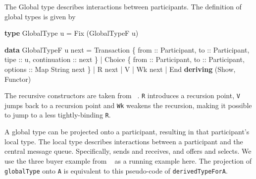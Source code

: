\documentclass[runningheads]{llncs}
\newenvironment{Shaded}{}{}
\newcommand{\KeywordTok}[1]{\textcolor[rgb]{0.00,0.44,0.13}{\textbf{#1}}}
\newcommand{\DataTypeTok}[1]{\textcolor[rgb]{0.56,0.13,0.00}{#1}}
\newcommand{\OtherTok}[1]{\textcolor[rgb]{0.00,0.44,0.13}{#1}}
\newcommand{\FunctionTok}[1]{\textcolor[rgb]{0.02,0.16,0.49}{#1}}
\newcommand{\NormalTok}[1]{#1}
\begin{document}
The Global type describes interactions between participants. The
definition of global types is given by

\begin{Shaded}
\begin{Highlighting}[]
\KeywordTok{type} \DataTypeTok{GlobalType}\NormalTok{ u }\FunctionTok{=} \DataTypeTok{Fix}\NormalTok{ (}\DataTypeTok{GlobalTypeF}\NormalTok{ u)}

\KeywordTok{data} \DataTypeTok{GlobalTypeF}\NormalTok{ u next}
    \FunctionTok{=} \DataTypeTok{Transaction} 
\NormalTok{        \{}\OtherTok{ from ::} \DataTypeTok{Participant}\NormalTok{,}\OtherTok{ to ::} \DataTypeTok{Participant}\NormalTok{,}\OtherTok{ tipe ::}\NormalTok{ u,}\OtherTok{ continuation ::}\NormalTok{  next \} }
    \FunctionTok{|} \DataTypeTok{Choice} 
\NormalTok{        \{}\OtherTok{ from ::} \DataTypeTok{Participant}\NormalTok{,}\OtherTok{ to ::} \DataTypeTok{Participant}\NormalTok{,}\OtherTok{ options ::} \DataTypeTok{Map} \DataTypeTok{String}\NormalTok{ next \}}
    \FunctionTok{|} \DataTypeTok{R}\NormalTok{ next}
    \FunctionTok{|} \DataTypeTok{V}
    \FunctionTok{|} \DataTypeTok{Wk}\NormalTok{ next}
    \FunctionTok{|} \DataTypeTok{End}
    \KeywordTok{deriving}\NormalTok{ (}\DataTypeTok{Show}\NormalTok{, }\DataTypeTok{Functor}\NormalTok{)}
\end{Highlighting}
\end{Shaded}

The recursive constructors are taken from ~\cite{cloud-haskell}. \texttt{R} introduces a
recursion point, \texttt{V} jumps back to a recursion point and
\texttt{Wk} weakens the recursion, making it possible to jump to a less
tightly-binding \texttt{R}.

A global type can be projected onto a participant, resulting in that
participant's local type. The local type describes interactions between
a participant and the central message queue. Specifically, sends and
receives, and offers and selects. We use the three buyer example from ~\cite{DBLP:conf/ppdp/MezzinaP17}
as a running example here. The projection of \texttt{globalType} onto
\texttt{A} is equivalent to this pseudo-code of
\texttt{derivedTypeForA}.
\end{document}

